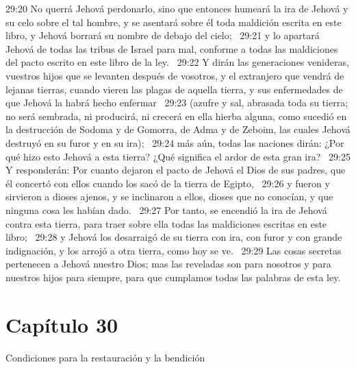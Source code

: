 29:20 No querrá Jehová perdonarlo, sino que entonces humeará la ira de Jehová y su celo sobre el tal hombre, y se asentará sobre él toda maldición escrita en este libro, y Jehová borrará su nombre de debajo del cielo;  
29:21 y lo apartará Jehová de todas las tribus de Israel para mal, conforme a todas las maldiciones del pacto escrito en este libro de la ley.  
29:22 Y dirán las generaciones venideras, vuestros hijos que se levanten después de vosotros, y el extranjero que vendrá de lejanas tierras, cuando vieren las plagas de aquella tierra, y sus enfermedades de que Jehová la habrá hecho enfermar  
29:23 (azufre y sal, abrasada toda su tierra; no será sembrada, ni producirá, ni crecerá en ella hierba alguna, como sucedió en la destrucción de Sodoma y de Gomorra, de Adma y de Zeboim, las cuales Jehová destruyó en su furor y en su ira);  
29:24 más aún, todas las naciones dirán: ¿Por qué hizo esto Jehová a esta tierra? ¿Qué significa el ardor de esta gran ira?  
29:25 Y responderán: Por cuanto dejaron el pacto de Jehová el Dios de sus padres, que él concertó con ellos cuando los sacó de la tierra de Egipto,  
29:26 y fueron y sirvieron a dioses ajenos, y se inclinaron a ellos, dioses que no conocían, y que ninguna cosa les habían dado.  
29:27 Por tanto, se encendió la ira de Jehová contra esta tierra, para traer sobre ella todas las maldiciones escritas en este libro;  
29:28 y Jehová los desarraigó de su tierra con ira, con furor y con grande indignación, y los arrojó a otra tierra, como hoy se ve.  
29:29 Las cosas secretas pertenecen a Jehová nuestro Dios; mas las reveladas son para nosotros y para nuestros hijos para siempre, para que cumplamos todas las palabras de esta ley.  
\section*{Capítulo 30}
Condiciones para la restauración y la bendición  

